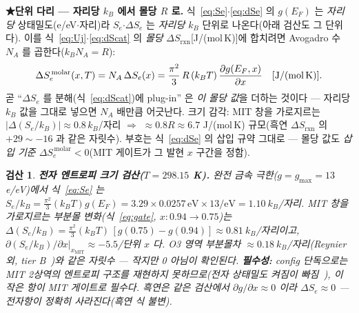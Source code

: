 \documentclass[11pt,a4paper]{article}
\newtheorem*{verifybox}{검산}
\newcommand{\rxn}{\mathrm{rxn}}
\begin{document}
\textbf{★단위 다리 — 자리당 $k_B$ 에서 몰당 $R$ 로.} 식~\eqref{eq:Se}$\cdot$\eqref{eq:dSe} 의 $g(E_F)$ 는 \emph{자리당}
상태밀도(e/eV$\cdot$자리)라 $S_e$$\cdot$$\Delta S_e$ 는 \emph{자리당 $k_B$} 단위로 나온다(아래 검산도 그 단위다). 이를
식~\eqref{eq:Uj}$\cdot$\eqref{eq:dScat} 의 \emph{몰당} $\Delta S_{\rxn}$[J/(mol\,K)]에 합치려면 Avogadro 수
$N_A$ 를 곱한다($k_B N_A=R$):
\begin{equation}
\Delta S_e^{\,\mathrm{molar}}(x,T)=N_A\,\Delta S_e(x)=\frac{\pi^2}{3}\,R\,(k_BT)\,\frac{\partial g(E_F,x)}{\partial x}
\quad[\text{J/(mol\,K)}].
\label{eq:dSemolar}
\end{equation}
곧 ``$\Delta S_e$ 를 분해(식~\eqref{eq:dScat})에 plug-in'' 은 \emph{이 몰당 값}을 더하는 것이다 — 자리당 $k_B$ 값을
그대로 넣으면 $N_A$ 배만큼 어긋난다. 크기 감각: MIT 창을 가로지르는 $|\Delta(S_e/k_B)|\approx0.8\,k_B$/자리 $\Rightarrow$
$\approx0.8R\approx6.7$ J/(mol\,K) 규모(흑연 $\Delta S_\rxn$ 의 $+29\sim-16$ 과 같은 자릿수). 부호는 식~\eqref{eq:dSe} 의
삽입 규약 그대로 — 몰당 값도 \emph{삽입 기준 $\Delta S_e^{\,\mathrm{molar}}<0$}(MIT 게이트가 그 발현 $x$ 구간을 정함).

\begin{verifybox}
\textbf{전자 엔트로피 크기 검산($T=298.15$ K).} 완전 금속 극한($g=g_{\max}=13$ e/eV)에서 식~\eqref{eq:Se} 는
$S_e/k_B=\frac{\pi^2}{3}(k_BT)g(E_F)=3.29\times0.0257\,\mathrm{eV}\times13/\mathrm{eV}=1.10\ k_B$/자리. MIT 창을
가로지르는 부분몰 변화(식~\eqref{eq:gate}, $x\!:\!0.94\!\to\!0.75$)는 $\Delta(S_e/k_B)=\frac{\pi^2}{3}(k_BT)\,
[g(0.75)-g(0.94)]\approx0.81\ k_B$/자리이고, $\partial(S_e/k_B)/\partial x|_{x_\mathrm{MIT}}\approx-5.5$/단위 $x$ 다.
O3 영역 부분몰차 $\approx0.18\ k_B$/자리(Reynier 외, tier B~\cite{reynier2004})와 같은 자릿수 — \emph{작지만 0 아님}이 확인된다.
\textbf{필수성:} config 단독으로는 MIT 2상역의 엔트로피 구조를 재현하지 못하므로(전자 상태밀도 켜짐이 빠짐~\cite{ml2024}), 이
작은 항이 MIT 게이트로 \emph{필수}다. 흑연은 같은 검산에서 $\partial g/\partial x\approx0$ 이라 $\Delta S_e\approx0$ —
전자항이 정확히 사라진다(흑연 식 불변).
\end{verifybox}
\end{document}
